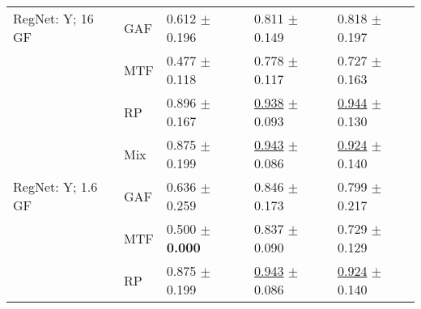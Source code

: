 \begin{tabular}{lllll}
RegNet: Y; 16 GF & GAF & \textcolor[rgb]{0.5904411765,0.4095588235,0}{0.612} $\pm$ \textcolor[rgb]{0.6989046730,0.3010953270,0}{0.196} & \textcolor[rgb]{0.4817095255,0.5000000000,0}{0.811} $\pm$ \textcolor[rgb]{0.4892671359,0.5000000000,0}{0.149} & \textcolor[rgb]{0.4712041885,0.5000000000,0}{0.818} $\pm$ \textcolor[rgb]{0.4681931484,0.5000000000,0}{0.197} \\
 & MTF & \textcolor[rgb]{0.8529411765,0.1470588235,0}{0.477} $\pm$ \textcolor[rgb]{0.4231220368,0.5000000000,0}{0.118} & \textcolor[rgb]{0.5903658095,0.4096341905,0}{0.778} $\pm$ \textcolor[rgb]{0.3129578004,0.5000000000,0}{0.117} & \textcolor[rgb]{0.7539267016,0.2460732984,0}{0.727} $\pm$ \textcolor[rgb]{0.3038066358,0.5000000000,0}{0.163} \\
 & RP & \textcolor[rgb]{0.0404411765,0.5000000000,0}{0.896} $\pm$ \textcolor[rgb]{0.5973732826,0.4026267174,0}{0.167} & \underline{\textcolor[rgb]{0.0557768924,0.5000000000,0}{0.938}} $\pm$ \textcolor[rgb]{0.1771602221,0.5000000000,0}{0.093} & \underline{\textcolor[rgb]{0.0785340314,0.5000000000,0}{0.944}} $\pm$ \textcolor[rgb]{0.1425478198,0.5000000000,0}{0.130} \\
 & Mix & \textcolor[rgb]{0.0808823529,0.5000000000,0}{0.875} $\pm$ \textcolor[rgb]{0.7127864450,0.2872135550,0}{0.199} & \underline{\textcolor[rgb]{0.0398406375,0.5000000000,0}{0.943}} $\pm$ \textcolor[rgb]{0.1408376023,0.5000000000,0}{0.086} & \underline{\textcolor[rgb]{0.1433246073,0.5000000000,0}{0.924}} $\pm$ \textcolor[rgb]{0.1910808871,0.5000000000,0}{0.140} \\
RegNet: Y; 1.6 GF & GAF & \textcolor[rgb]{0.5441176471,0.4558823529,0}{0.636} $\pm$ \textcolor[rgb]{0.9254467099,0.0745532901,0}{0.259} & \textcolor[rgb]{0.3638778220,0.5000000000,0}{0.846} $\pm$ \textcolor[rgb]{0.6251896337,0.3748103663,0}{0.173} & \textcolor[rgb]{0.5320680628,0.4679319372,0}{0.799} $\pm$ \textcolor[rgb]{0.5701337530,0.4298662470,0}{0.217} \\
 & MTF & \textcolor[rgb]{0.8088235294,0.1911764706,0}{0.500} $\pm$ \textbf{\textcolor[rgb]{0.0000000000,0.5000000000,0}{0.000}} & \textcolor[rgb]{0.3930942895,0.5000000000,0}{0.837} $\pm$ \textcolor[rgb]{0.1599508149,0.5000000000,0}{0.090} & \textcolor[rgb]{0.7480366492,0.2519633508,0}{0.729} $\pm$ \textcolor[rgb]{0.1375876474,0.5000000000,0}{0.129} \\
 & RP & \textcolor[rgb]{0.0808823529,0.5000000000,0}{0.875} $\pm$ \textcolor[rgb]{0.7127864450,0.2872135550,0}{0.199} & \underline{\textcolor[rgb]{0.0398406375,0.5000000000,0}{0.943}} $\pm$ \textcolor[rgb]{0.1408376023,0.5000000000,0}{0.086} & \underline{\textcolor[rgb]{0.1433246073,0.5000000000,0}{0.924}} $\pm$ \textcolor[rgb]{0.1910808871,0.5000000000,0}{0.140} \\

\end{tabular}
